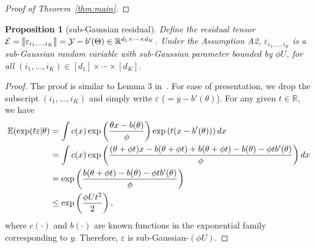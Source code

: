 \documentclass[11pt]{article}
\theoremstyle{plain}
\newtheorem{prop}{Proposition}
\theoremstyle{definition}
\begin{document}
\begin{proof}[Proof of Theorem~\ref{thm:main}]
\end{proof}

\begin{prop}[sub-Gaussian residual]\label{prop}
Define the residual tensor $\mathcal{E}=\llbracket \varepsilon_{i_1,\ldots,i_K} \rrbracket=\mathcal{Y}-b'(\Theta)\in\mathbb{R}^{d_1\times \cdots \times d_K}$. Under the Assumption A2, $\varepsilon_{i_1,\ldots,i_K}$ is a sub-Gaussian random variable with sub-Gaussian parameter bounded by $\phi U$, for all $(i_1,\ldots,i_K)\in[d_1]\times\cdots\times[d_K]$.
\end{prop}
\begin{proof} The proof is similar to Lemma 3 in~\cite{fan2019generalized}. For ease of presentation, we drop the subscript $(i_1,\ldots,i_K)$ and simply write $\varepsilon$ ($=y-b'(\theta)$). For any given $t\in\mathbb{R}$, we have
\begin{align}
\mathbb{E}(\exp(t\varepsilon|\theta)&=\int c(x) \exp\left({\theta x - b(\theta)\over \phi}   \right)\exp \left(t(x-b'(\theta))\right)dx\\
&=\int c(x)\exp \left( {(\theta + \phi t)x - b (\theta+\phi t)+b(\theta+\phi t)-b(\theta)-\phi t b'(\theta) \over \phi}\right)dx\\
&=\exp\left( {b(\theta+\phi t)-b(\theta)-\phi t b'(\theta) \over \phi} \right)\\
&\leq \exp\left(\phi U t^2\over 2 \right),
\end{align}
where $c(\cdot)$ and $b(\cdot)$ are known functions in the exponential family corresponding to $y$. 
Therefore, $\varepsilon$ is sub-Gaussian-$(\phi U)$. 
\end{proof}
\end{document}
